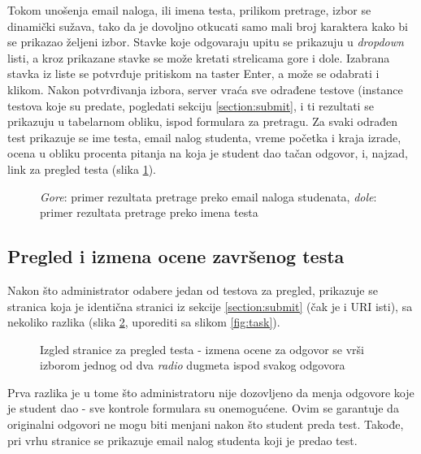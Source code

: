 Tokom unošenja email naloga, ili imena testa, prilikom pretrage, izbor se dinamički sužava, tako da je dovoljno otkucati samo mali broj karaktera kako bi se prikazao željeni izbor. Stavke koje odgovaraju upitu se prikazuju u \textit{dropdown} listi, a kroz prikazane stavke se može kretati strelicama gore i dole. Izabrana stavka iz liste se potvrđuje pritiskom na taster Enter, a može se odabrati i klikom. Nakon potvrđivanja izbora, server vraća sve odrađene testove (instance testova koje su predate, pogledati sekciju \ref{section:submit}, i ti rezultati se prikazuju u tabelarnom obliku, ispod formulara za pretragu. Za svaki odrađen test prikazuje se ime testa, email nalog studenta, vreme početka i kraja izrade, ocena u obliku procenta pitanja na koja je student dao tačan odgovor, i, najzad, link za pregled testa (slika \ref{fig:assignments-admin-results}).
\begin{figure}[h]
\centering
{}
\caption{\textit{Gore}: primer rezultata pretrage preko email naloga studenata, \textit{dole}: primer rezultata pretrage preko imena testa}
\label{fig:assignments-admin-results}
\end{figure}

\subsection{Pregled i izmena ocene završenog testa}
Nakon što administrator odabere jedan od testova za pregled, prikazuje se stranica koja je identična stranici iz sekcije \ref{section:submit} (čak je i URI isti), sa nekoliko razlika (slika \ref{fig:task-admin}, uporediti sa slikom \ref{fig:task}).
\begin{figure}[h]
\centering
{}
\caption{Izgled stranice za pregled testa - izmena ocene za odgovor se vrši izborom jednog od dva \textit{radio} dugmeta ispod svakog odgovora}
\label{fig:task-admin}
\end{figure}
Prva razlika je u tome što administratoru nije dozovljeno da menja odgovore koje je student dao - sve kontrole formulara su onemogućene. Ovim se garantuje da originalni odgovori ne mogu biti menjani nakon što student preda test. Takođe, pri vrhu stranice se prikazuje email nalog studenta koji je predao test.

